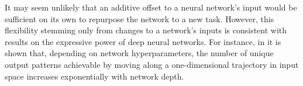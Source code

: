 \documentclass{article}
\newcommand{\jcom}[1]{{\textcolor{darkgreen}{[Jascha: #1]}}}
\begin{document}
It may seem unlikely that an additive offset to a neural network's input would be sufficient on its own to repurpose the network to a new task. 
However, this flexibility stemming 
only from changes to a network's inputs is consistent with results on the expressive power of deep neural networks. 
For instance, in \citet{raghu2016expressive} it is shown that, depending on network hyperparameters, the number of unique output patterns achievable by moving along a one-dimensional trajectory in input space increases exponentially with network depth. 
\end{document}

